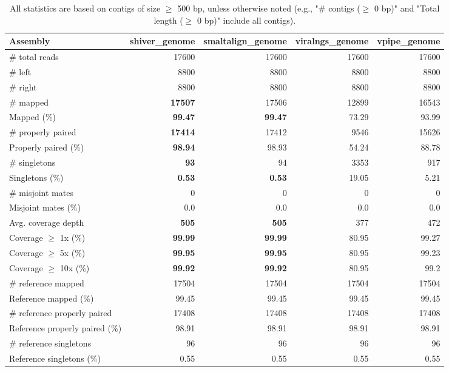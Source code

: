 \documentclass[12pt,a4paper]{article}
\begin{document}
\begin{table}[ht]
\begin{center}
\caption{All statistics are based on contigs of size $\geq$ 500 bp, unless otherwise noted (e.g., "\# contigs ($\geq$ 0 bp)" and "Total length ($\geq$ 0 bp)" include all contigs).}
\begin{tabular}{|l*{4}{|r}|}
\hline
Assembly & shiver\_genome & smaltalign\_genome & viralngs\_genome & vpipe\_genome \\ \hline
\# total reads & 17600 & 17600 & 17600 & 17600 \\ \hline
\# left & 8800 & 8800 & 8800 & 8800 \\ \hline
\# right & 8800 & 8800 & 8800 & 8800 \\ \hline
\# mapped & {\bf 17507} & 17506 & 12899 & 16543 \\ \hline
Mapped (\%) & {\bf 99.47} & {\bf 99.47} & 73.29 & 93.99 \\ \hline
\# properly paired & {\bf 17414} & 17412 & 9546 & 15626 \\ \hline
Properly paired (\%) & {\bf 98.94} & 98.93 & 54.24 & 88.78 \\ \hline
\# singletons & {\bf 93} & 94 & 3353 & 917 \\ \hline
Singletons (\%) & {\bf 0.53} & {\bf 0.53} & 19.05 & 5.21 \\ \hline
\# misjoint mates & 0 & 0 & 0 & 0 \\ \hline
Misjoint mates (\%) & 0.0 & 0.0 & 0.0 & 0.0 \\ \hline
Avg. coverage depth & {\bf 505} & {\bf 505} & 377 & 472 \\ \hline
Coverage $\geq$ 1x (\%) & {\bf 99.99} & {\bf 99.99} & 80.95 & 99.27 \\ \hline
Coverage $\geq$ 5x (\%) & {\bf 99.95} & {\bf 99.95} & 80.95 & 99.23 \\ \hline
Coverage $\geq$ 10x (\%) & {\bf 99.92} & {\bf 99.92} & 80.95 & 99.2 \\ \hline
\# reference mapped & 17504 & 17504 & 17504 & 17504 \\ \hline
Reference mapped (\%) & 99.45 & 99.45 & 99.45 & 99.45 \\ \hline
\# reference properly paired & 17408 & 17408 & 17408 & 17408 \\ \hline
Reference properly paired (\%) & 98.91 & 98.91 & 98.91 & 98.91 \\ \hline
\# reference singletons & 96 & 96 & 96 & 96 \\ \hline
Reference singletons (\%) & 0.55 & 0.55 & 0.55 & 0.55 \\ \hline

\end{tabular}
\end{center}
\end{table}
\end{document}
